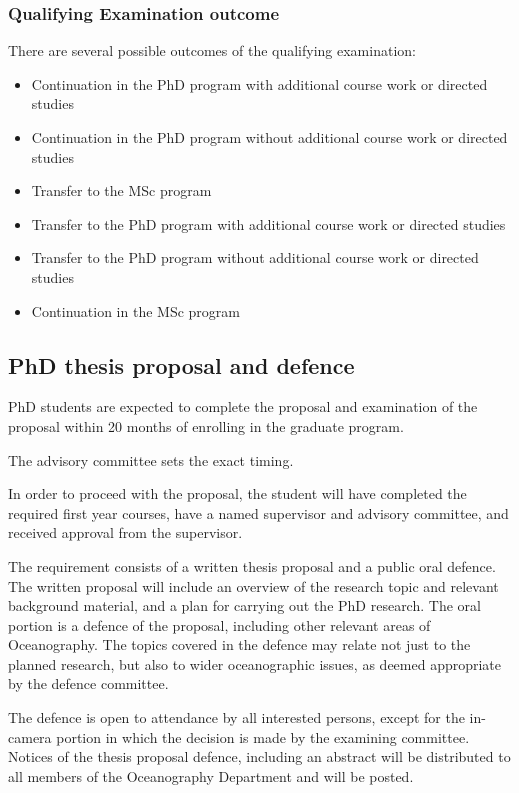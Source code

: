 \documentclass[12pt]{article}
\begin{document}
\subsubsection{Qualifying Examination outcome}

There are several possible outcomes of the qualifying examination:

\begin{itemize}

\item Continuation in the PhD program with additional course work or directed studies
\item Continuation in the PhD program without additional course work or directed studies
\item Transfer to the MSc program
\item Transfer to the PhD program with additional course work or directed studies
\item Transfer to the PhD program without additional course work or directed studies
\item Continuation in the MSc program

\end{itemize}

\subsection{PhD thesis proposal and defence}

PhD students are expected to complete the proposal and examination of the
proposal within 20 months of enrolling in the graduate program.

The advisory committee sets the exact timing.

In order to proceed with the proposal, the student will have completed the
required first year courses, have a named supervisor and advisory committee,
and received approval from the supervisor.

The requirement consists of a written thesis proposal and a public oral
defence.  The written proposal will include an overview of the research topic
and relevant background material, and a plan for carrying out the PhD research.
The oral portion is a defence of the proposal, including other relevant areas
of Oceanography. The topics covered in the defence may relate not just to the
planned research, but also to wider oceanographic issues, as deemed appropriate
by the defence committee.

The defence is open to attendance by all interested persons, except for the
in-camera portion in which the decision is made by the examining committee.
Notices of the thesis proposal defence, including an abstract will be
distributed to all members of the Oceanography Department and will be posted.
\end{document}
